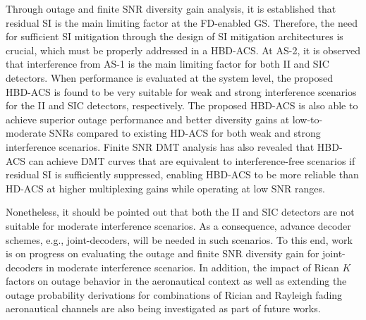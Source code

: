 Through outage and finite SNR diversity gain analysis, it is established that residual SI is the main limiting factor at the FD-enabled GS. Therefore, the need for sufficient SI mitigation through the design of SI mitigation architectures is crucial, which must be properly addressed in a HBD-ACS. At AS-2, it is observed that interference from AS-1 is the main limiting factor for both II and SIC detectors. When performance is evaluated at the system level, the proposed HBD-ACS is found to be very suitable for weak and strong interference scenarios for the II and SIC detectors, respectively. The proposed HBD-ACS is also able to achieve superior outage performance and better diversity gains at low-to-moderate SNRs compared to existing HD-ACS for both weak and strong interference scenarios. Finite SNR DMT analysis has also revealed that HBD-ACS can achieve DMT curves that are equivalent to interference-free scenarios if residual SI is sufficiently suppressed, enabling HBD-ACS to be more reliable than HD-ACS at higher multiplexing gains while operating at low SNR ranges.

Nonetheless, it should be pointed out that both the II and SIC detectors are not suitable for moderate interference scenarios. As a consequence, advance decoder schemes, e.g., joint-decoders, will be needed in such scenarios. To this end, work is on progress on evaluating the outage and finite SNR diversity gain for joint-decoders in moderate interference scenarios. In addition, the impact of Rican $K$ factors on outage behavior in the aeronautical context as well as extending the outage probability derivations for combinations of Rician and Rayleigh fading aeronautical channels are also being investigated as part of future works.


